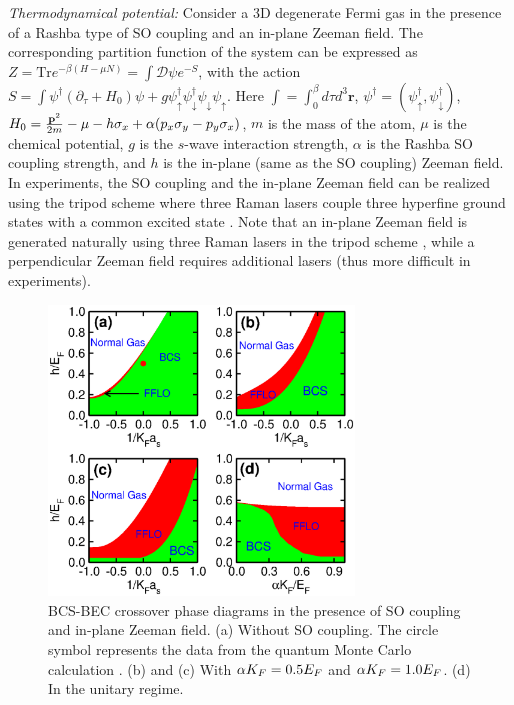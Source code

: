 \documentclass[prl,showpacs,twocolumn]{revtex4}
\begin{document}
\textit{Thermodynamical potential:} Consider a 3D degenerate Fermi gas in
the presence of a Rashba type of SO coupling and an in-plane Zeeman field.
The corresponding partition function of the system can be expressed as $Z=%
\text{Tr}e^{-\beta (H-\mu N)}=\int \mathcal{D}\psi e^{-S}$, with the action $%
S=\int \psi ^{\dagger }(\partial _{\tau }+H_{0})\psi +g\psi _{\uparrow
}^{\dagger }\psi _{\downarrow }^{\dagger }\psi _{\downarrow }\psi _{\uparrow
}$. Here $\int =\int_{0}^{\beta }d\tau d^{3}\mathbf{r}$, $\psi ^{\dagger
}=(\psi _{\uparrow }^{\dagger },\psi _{\downarrow }^{\dagger })$, $H_{0}={%
\frac{\mathbf{p}^{2}}{2m}}-\mu -h\sigma _{x}+\alpha (p_{x}\sigma
_{y}-p_{y}\sigma _{x})$, $m$ is the mass of the atom, $\mu $ is the chemical
potential, $g$ is the $s$-wave interaction strength, $\alpha $ is the Rashba
SO coupling strength, and $h$ is the in-plane (same as the SO coupling)
Zeeman field. In experiments, the SO coupling and the in-plane Zeeman field
can be realized using the tripod scheme where three Raman lasers couple
three hyperfine ground states with a common excited state \cite%
{Tudor,Dalibard,YP,note}. Note that an in-plane Zeeman field is generated
naturally using three Raman lasers in the tripod scheme \cite%
{Tudor,Dalibard,YP}, while a perpendicular Zeeman field requires additional
lasers \cite{Zhang2} (thus more difficult in experiments).

\begin{figure}[t]
\includegraphics[width=3.2in]{phasediag22.eps} \centering
\caption{BCS-BEC crossover phase diagrams in the presence of SO coupling and
in-plane Zeeman field. (a) Without SO coupling. The circle symbol represents
the data from the quantum Monte Carlo calculation \protect\cite{Carlson}.
(b) and (c) With $\protect\alpha K_{F}=0.5E_{F}$ and $\protect\alpha %
K_{F}=1.0E_{F}$. (d) In the unitary regime.}
\label{fig-phase}
\end{figure}
\end{document}
